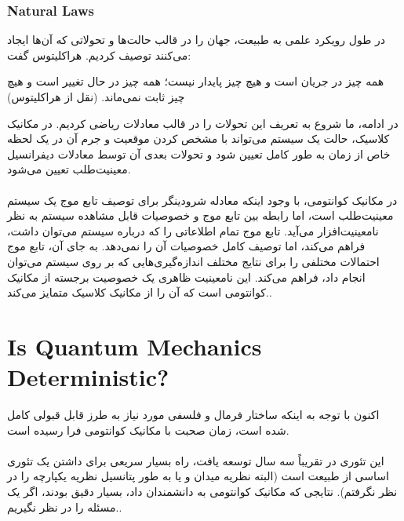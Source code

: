 \documentclass[10pt,a4paper]{article}
\begin{document}
            \subsubsection{Natural Laws}
در طول رویکرد علمی به طبیعت، جهان را در قالب حالت‌ها و تحولاتی که آن‌ها ایجاد می‌کنند توصیف کردیم. هراکلیتوس گفت: 
                \begin{qt}
همه چیز در جریان است و هیچ چیز پایدار نیست؛ همه چیز در حال تغییر است و هیچ چیز ثابت نمی‌ماند. (نقل از هراکلیتوس)
                \end{qt}
در ادامه، ما شروع به تعریف این تحولات را در قالب معادلات ریاضی کردیم. در مکانیک کلاسیک، حالت یک سیستم می‌تواند با مشخص کردن موقعیت و جرم آن در یک لحظه خاص از زمان به طور کامل تعیین شود و تحولات بعدی آن توسط معادلات دیفرانسیل معینیت‌طلب تعیین می‌شود.
                \\
                \\
در مکانیک کوانتومی، با وجود اینکه معادله شرودینگر برای توصیف تابع موج یک سیستم معینیت‌طلب است، اما رابطه بین تابع موج و خصوصیات قابل مشاهده سیستم به نظر نامعینیت‌افزار می‌آید. تابع موج تمام اطلاعاتی را که درباره سیستم می‌توان داشت، فراهم می‌کند، اما توصیف کامل خصوصیات آن را نمی‌دهد. به جای آن، تابع موج احتمالات مختلفی را برای نتایج مختلف اندازه‌گیری‌هایی که بر روی سیستم می‌توان انجام داد، فراهم می‌کند. این نامعینیت ظاهری یک خصوصیت برجسته از مکانیک کوانتومی است که آن را از مکانیک کلاسیک متمایز می‌کند..\cite{enwiki:1092966327}
    \section{Is Quantum Mechanics Deterministic?}
اکنون با توجه به اینکه ساختار فرمال و فلسفی مورد نیاز به طرز قابل قبولی کامل شده است، زمان صحبت با مکانیک کوانتومی فرا رسیده است.
        \\
        \\
        این تئوری در تقریباً سه سال توسعه یافت، راه بسیار سریعی برای داشتن یک تئوری اساسی از طبیعت است (البته نظریه میدان و یا به طور پتانسیل نظریه یکپارچه را در نظر نگرفتم). نتایجی که مکانیک کوانتومی به دانشمندان داد، بسیار دقیق بودند، اگر یک مسئله را در نظر نگیریم..\cite{enwiki:1142268588}
\end{document}
